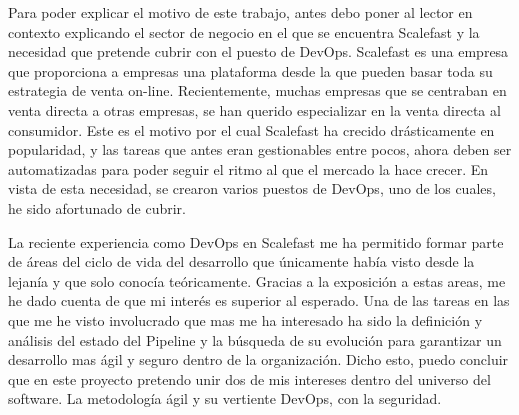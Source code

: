 \documentclass[12pt]{report} %
\begin{document}
Para poder explicar el motivo de este trabajo, antes debo poner al lector en
contexto explicando el sector de negocio en el que se encuentra Scalefast y la
necesidad que pretende cubrir con el puesto de \gls{DevOps}.
Scalefast es una empresa que proporciona a empresas una plataforma desde la que
pueden basar toda su estrategia de venta on-line.
Recientemente, muchas empresas que se centraban en venta directa a otras
empresas, se han querido especializar en la venta directa al consumidor.
Este es el motivo por el cual Scalefast ha crecido drásticamente en
popularidad, y las tareas que antes eran gestionables entre pocos, ahora deben
ser automatizadas para poder seguir el ritmo al que el mercado la hace crecer.
En vista de esta necesidad, se crearon varios puestos de \gls{DevOps}, uno de
los cuales, he sido afortunado de cubrir.

La reciente experiencia como DevOps en Scalefast me ha permitido formar parte
de áreas del ciclo de vida del desarrollo que únicamente había visto desde la
lejanía y que solo conocía teóricamente.
Gracias a la exposición a estas areas, me he dado cuenta de que mi interés es superior al esperado.
Una de las tareas en las que me he visto involucrado que mas me ha interesado 
ha sido la definición y análisis del estado del Pipeline y la búsqueda de su
evolución para garantizar un desarrollo mas ágil y seguro dentro de la
organización.
Dicho esto, puedo concluir que en este proyecto pretendo unir dos de mis intereses dentro del universo del software.  
La metodología ágil y su vertiente DevOps, con la seguridad.
\end{document}
